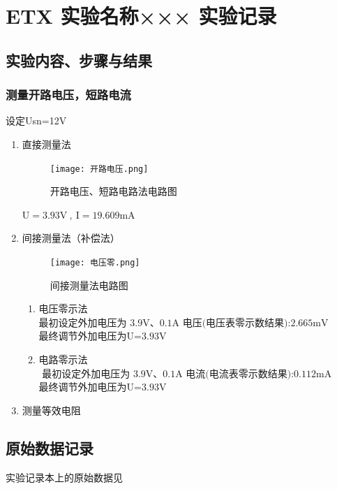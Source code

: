 \documentclass[dvipsnames, svgnames,a4paper,11pt]{article}
\begin{document}
	\section{ETX 实验名称×××  \quad\heiti 实验记录}
	
	\subsection{实验内容、步骤与结果}
	
	\subsubsection{测量开路电压，短路电流} 
	设定Usn=12V
	\begin{enumerate}
		\item
		直接测量法
		 \begin{figure}[H]
			\centering
			\texttt{[image: 开路电压.png]}
			\caption{开路电压、短路电路法电路图}
			\label{}
		  \end{figure}
		 $\mathrm{U=3.93V~,~I=19.609mA}$
		  \item 间接测量法（补偿法）
		 \begin{figure}[H]
			\centering
			\texttt{[image: 电压零.png]}
			\caption{间接测量法电路图}
			\label{}
		 \end{figure}
		 \begin{enumerate}
	     
		 \item 电压零示法\\
		 $\text{最初设定外加电压为 3.9V、0.1A   电压(电压表零示数结果):2.665mV }$\\
		 最终调节外加电压为$\text{U=3.93V}$
		 
		 \item 电路零示法\\
		 $\text{ 最初设定外加电压为 3.9V、0.1A  电流(电流表零示数结果):0.112mA }$\\
		 最终调节外加电压为$\text{U=3.93V}$
		 
		 \end{enumerate}	
		 
		 \item 测量等效电阻
		 
	    
		
	\end{enumerate}	


	
	
	\clearpage
	\subsection{原始数据记录}
	实验记录本上的原始数据见%
	
\end{document}
